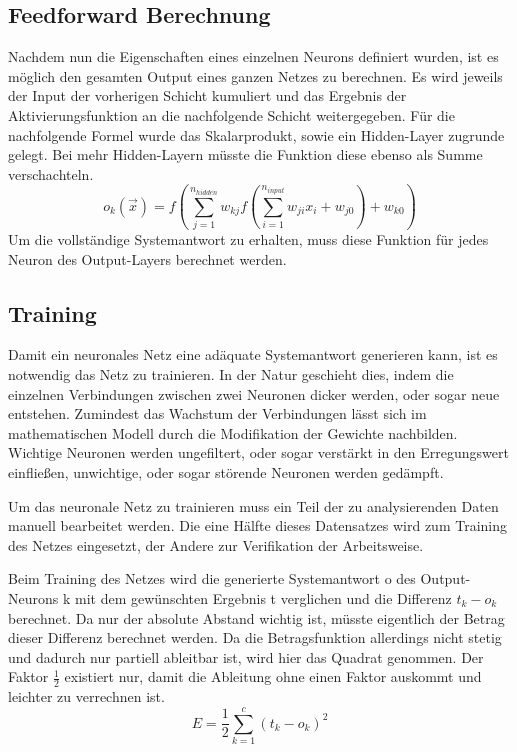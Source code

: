 \subsection{Feedforward Berechnung}
Nachdem nun die Eigenschaften eines einzelnen Neurons definiert wurden, ist es möglich den gesamten Output eines ganzen Netzes zu berechnen.  Es wird jeweils der Input der vorherigen Schicht kumuliert und das Ergebnis der Aktivierungsfunktion an die nachfolgende Schicht weitergegeben. Für die nachfolgende Formel wurde das Skalarprodukt, sowie ein Hidden-Layer zugrunde gelegt. Bei mehr Hidden-Layern müsste die Funktion diese ebenso als Summe verschachteln.
\begin{equation}
o_{k}(\vec{x})=f\left( \sum_{j=1}^{n_{hidden}} w_{kj} f\left(\sum_{i=1}^{n_{input}} w_{ji}x_{i}+w_{j0} \right)+w_{k0} \right)
\end{equation}
Um die vollständige Systemantwort zu erhalten, muss diese Funktion für jedes Neuron des Output-Layers berechnet werden.

\subsection{Training}

Damit ein neuronales Netz eine adäquate Systemantwort generieren kann, ist es notwendig das Netz zu trainieren. In der Natur geschieht dies, indem die einzelnen Verbindungen zwischen zwei Neuronen dicker werden, oder sogar neue entstehen. Zumindest das Wachstum der Verbindungen lässt sich im mathematischen Modell durch die Modifikation der Gewichte nachbilden. Wichtige Neuronen werden ungefiltert, oder sogar verstärkt in den Erregungswert einfließen, unwichtige, oder sogar störende Neuronen werden gedämpft.

Um das neuronale Netz zu trainieren muss ein Teil der zu analysierenden Daten manuell bearbeitet werden. Die eine Hälfte dieses Datensatzes wird zum Training des Netzes eingesetzt, der Andere zur Verifikation der Arbeitsweise.
 
Beim Training des Netzes wird die generierte Systemantwort o des Output-Neurons k mit dem gewünschten Ergebnis t verglichen und die Differenz $t_k - o_k$ berechnet. Da nur der absolute Abstand wichtig ist, müsste eigentlich der Betrag dieser Differenz berechnet werden. Da die Betragsfunktion allerdings nicht stetig und dadurch nur partiell ableitbar ist, wird hier das Quadrat genommen. Der Faktor $\frac{1}{2}$ existiert nur, damit die Ableitung ohne einen Faktor auskommt und leichter zu verrechnen ist.
\begin{equation}
E = \frac{1}{2} \sum_{k=1}^{c}(t_{k}-o_{k})^2
\end{equation}

